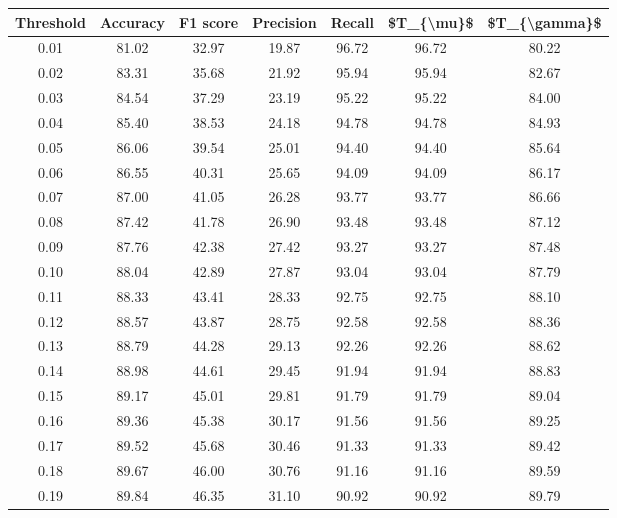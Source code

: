 \begin{tabular}{|c|c|c|c|c|c|c|}
\hline
 Threshold &  Accuracy &  F1 score &  Precision &  Recall &  \$T\_\{\textbackslash mu\}\$ &  \$T\_\{\textbackslash gamma\}\$ \\
\hline
      0.01 &     81.02 &     32.97 &      19.87 &   96.72 &      96.72 &         80.22 \\
      0.02 &     83.31 &     35.68 &      21.92 &   95.94 &      95.94 &         82.67 \\
      0.03 &     84.54 &     37.29 &      23.19 &   95.22 &      95.22 &         84.00 \\
      0.04 &     85.40 &     38.53 &      24.18 &   94.78 &      94.78 &         84.93 \\
      0.05 &     86.06 &     39.54 &      25.01 &   94.40 &      94.40 &         85.64 \\
      0.06 &     86.55 &     40.31 &      25.65 &   94.09 &      94.09 &         86.17 \\
      0.07 &     87.00 &     41.05 &      26.28 &   93.77 &      93.77 &         86.66 \\
      0.08 &     87.42 &     41.78 &      26.90 &   93.48 &      93.48 &         87.12 \\
      0.09 &     87.76 &     42.38 &      27.42 &   93.27 &      93.27 &         87.48 \\
      0.10 &     88.04 &     42.89 &      27.87 &   93.04 &      93.04 &         87.79 \\
      0.11 &     88.33 &     43.41 &      28.33 &   92.75 &      92.75 &         88.10 \\
      0.12 &     88.57 &     43.87 &      28.75 &   92.58 &      92.58 &         88.36 \\
      0.13 &     88.79 &     44.28 &      29.13 &   92.26 &      92.26 &         88.62 \\
      0.14 &     88.98 &     44.61 &      29.45 &   91.94 &      91.94 &         88.83 \\
      0.15 &     89.17 &     45.01 &      29.81 &   91.79 &      91.79 &         89.04 \\
      0.16 &     89.36 &     45.38 &      30.17 &   91.56 &      91.56 &         89.25 \\
      0.17 &     89.52 &     45.68 &      30.46 &   91.33 &      91.33 &         89.42 \\
      0.18 &     89.67 &     46.00 &      30.76 &   91.16 &      91.16 &         89.59 \\
      0.19 &     89.84 &     46.35 &      31.10 &   90.92 &      90.92 &         89.79 \\

\end{tabular}
